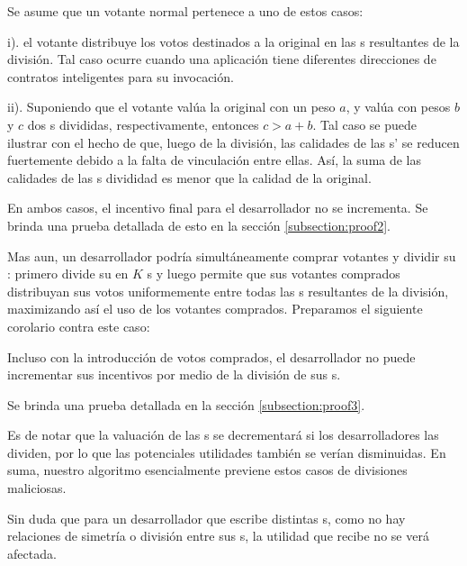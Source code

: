 Se asume que un votante normal pertenece a uno de estos casos:
\begin{inparaenum}
\item[i).] el votante distribuye los votos destinados a la \dapp original en las {\dapp}s resultantes de la división. Tal caso ocurre cuando una aplicación tiene diferentes direcciones de contratos inteligentes para su invocación.
\item[ii).] Suponiendo que el votante valúa la \dapp original con un peso $a$, y valúa con pesos $b$ y $c$ dos {\dapp}s divididas, respectivamente, entonces $c>a+b$. Tal caso se puede ilustrar con el hecho de que, luego de la división, las calidades de las {\dapp}s' se reducen fuertemente debido a la falta de vinculación entre ellas. Así, la suma de las calidades de las {\dapp}s divididad es menor que la calidad de la \dapp original.
 \end{inparaenum}

  En ambos casos, el incentivo final para el desarrollador no se incrementa. Se brinda una prueba detallada de esto en la sección \ref{subsection:proof2}.

Mas aun, un desarrollador podría simultáneamente comprar votantes y dividir su \dapp: primero divide su \dapp en $K$ {\dapp}s y luego permite que sus votantes comprados distribuyan sus votos uniformemente entre todas las {\dapp}s resultantes de la división, maximizando así el uso de los votantes comprados. Preparamos el siguiente corolario contra este caso:

\begin{corollary}
	\label{c1}
	Incluso con la introducción de votos comprados, el desarrollador no puede incrementar sus incentivos por medio de la división de sus {\dapp}s.
\end{corollary}

Se brinda una prueba detallada en la sección \ref{subsection:proof3}.

Es de notar que la valuación de las {\dapp}s se decrementará si los desarrolladores las dividen, por lo que las potenciales utilidades también se verían disminuidas. En suma, nuestro algoritmo esencialmente previene estos casos de divisiones maliciosas.

Sin duda que para un desarrollador que escribe distintas {\dapp}s,
como no hay relaciones de simetría o división entre sus {\dapp}s, la utilidad que recibe no se verá afectada.

